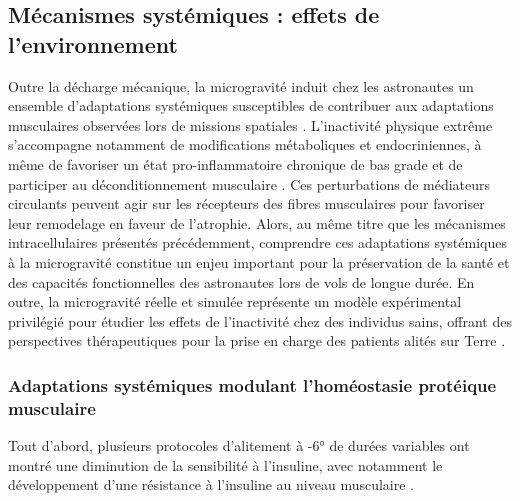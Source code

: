 \documentclass[11pt]{report}
\begin{document}
\subsection{Mécanismes systémiques : effets de l'environnement}

Outre la décharge mécanique, la microgravité induit chez les astronautes un ensemble d'adaptations systémiques susceptibles de contribuer aux adaptations musculaires observées lors de missions spatiales \parencite{lee_factors_2022}. L'inactivité physique extrême s'accompagne notamment de modifications métaboliques et endocriniennes, à même de favoriser un état pro-inflammatoire chronique de bas grade et de participer au déconditionnement musculaire \parencite{Eggelbusch2024Jan, bergouignan_physical_2011,lee_factors_2022,MiriamCapri2025Sep,navasiolava_vascular_2020}. Ces perturbations de médiateurs circulants peuvent agir sur les récepteurs des fibres musculaires pour favoriser leur remodelage en faveur de l'atrophie. Alors, au même titre que les mécanismes intracellulaires présentés précédemment, comprendre ces adaptations systémiques à la microgravité constitue un enjeu important pour la préservation de la santé et des capacités fonctionnelles des astronautes lors de vols de longue durée. En outre, la microgravité réelle et simulée représente un modèle expérimental privilégié pour étudier les effets de l'inactivité chez des individus sains, offrant des perspectives thérapeutiques pour la prise en charge des patients alités sur Terre \parencite{navasiolava_vascular_2020}.

\subsubsection{Adaptations systémiques modulant l'homéostasie protéique musculaire}

Tout d'abord, plusieurs protocoles d'alitement à -6° de durées variables ont montré une diminution de la sensibilité à l'insuline, avec notamment le développement d'une résistance à l'insuline au niveau musculaire \parencite{bergouignan_physical_2011}. 
\end{document}
